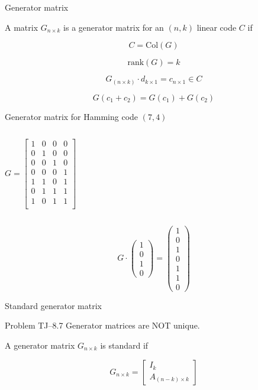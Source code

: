 \begin{frame}{Generator matrix}
  \begin{definition}
	A matrix $G_{n \times k}$ is a generator matrix for an $(n,k)$ linear code $C$ if 
	
	\[
	  C = \text{Col}(G)
	\]
  \end{definition}

  \[
	\text{rank}(G) = k
  \]

  \[
	G_{(n \times k)} \cdot d_{k \times 1} = c_{n \times 1} \in C
  \]

  \[
	G(c_1 + c_2) = G(c_1) + G(c_2)
  \]
\end{frame}
\begin{frame}{Generator matrix for Hamming code $(7,4)$}
  \begin{columns}
	  \[
		G = \begin{bmatrix}
		  1 & 0 & 0 & 0 \\
		  0 & 1 & 0 & 0 \\
		  0 & 0 & 1 & 0 \\
		  0 & 0 & 0 & 1 \\
		  1 & 1 & 0 & 1 \\
		  0 & 1 & 1 & 1 \\
		  1 & 0 & 1 & 1 \\
		\end{bmatrix}
	  \]

  \end{columns}

  \[
	G \cdot \begin{pmatrix}
	  1 \\ 0 \\ 1 \\ 0
	\end{pmatrix}
	= \begin{pmatrix}
	  1 \\ 0 \\ 1 \\ 0 \\ 1 \\ 1 \\ 0
	\end{pmatrix}
  \]
\end{frame}
\begin{frame}{Standard generator matrix}
  \begin{exampleblock}{Problem TJ--8.7}
	Generator matrices are NOT unique.
  \end{exampleblock}

  \begin{definition}
	A generator matrix $G_{n \times k}$ is standard if

	\[
	  G_{n \times k} = \begin{bmatrix}
		I_k \\ A_{(n-k) \times k}
	  \end{bmatrix}
	\]
  \end{definition}
\end{frame}
